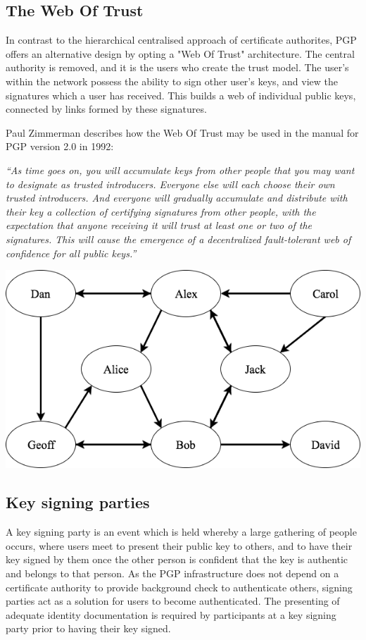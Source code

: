 \subsection{The Web Of Trust}

In contrast to the hierarchical centralised approach of certificate authorites, PGP offers an alternative design by opting a "Web Of Trust" architecture. The central authority is removed, and it is the users who create the trust model. The user’s within the network possess the ability to sign other user’s keys, and view the signatures which a user has received. This builds a web of individual public keys, connected by links formed by these signatures.

Paul Zimmerman describes how the Web Of Trust may be used in the manual for PGP version 2.0 in 1992:

\textit{“As time goes on, you will accumulate keys from other people that you may want to designate as trusted introducers. Everyone else will each choose their own trusted introducers. And everyone will gradually accumulate and distribute with their key a collection of certifying signatures from other people, with the expectation that anyone receiving it will trust at least one or two of the signatures. This will cause the emergence of a decentralized fault-tolerant web of confidence for all public keys.”}

\begin{center}
  \includegraphics[scale=.75]{WOT_CONNECTION.png}
  \label{fig:Prob1:MEA}
\end{center}

\subsection{Key signing parties}
A key signing party is an event which is held whereby a large gathering of people occurs, where users meet to present their public key to others, and to have their key signed by them once the other person is confident that the key is authentic and belongs to that person. As the PGP infrastructure does not depend on a certificate authority to provide background check to authenticate others, signing parties act as a solution for users to become authenticated. The presenting of adequate identity documentation is required by participants at a key signing party prior to having their key signed.

